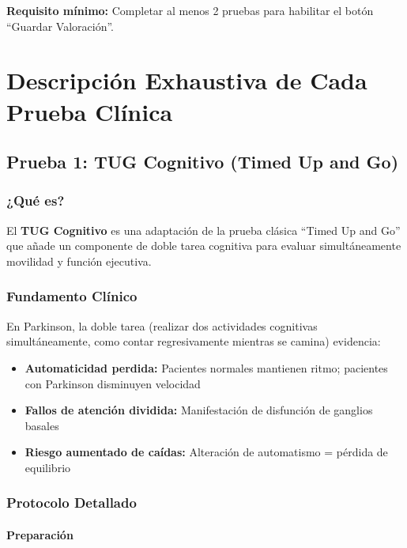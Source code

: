 \documentclass[12pt,a4paper,spanish,oneside]{book}
\begin{document}
\textbf{Requisito mínimo:} Completar al menos 2 pruebas para habilitar el botón ``Guardar Valoración''.

\chapter{Descripción Exhaustiva de Cada Prueba Clínica}

\section{Prueba 1: TUG Cognitivo (Timed Up and Go)}

\subsection{¿Qué es?}

El \textbf{TUG Cognitivo} es una adaptación de la prueba clásica ``Timed Up and Go'' que añade un componente de doble tarea cognitiva para evaluar simultáneamente movilidad y función ejecutiva.

\subsection{Fundamento Clínico}

En Parkinson, la doble tarea (realizar dos actividades cognitivas simultáneamente, como contar regresivamente mientras se camina) evidencia:

\begin{itemize}
  \item \textbf{Automaticidad perdida:} Pacientes normales mantienen ritmo; pacientes con Parkinson disminuyen velocidad
  \item \textbf{Fallos de atención dividida:} Manifestación de disfunción de ganglios basales
  \item \textbf{Riesgo aumentado de caídas:} Alteración de automatismo = pérdida de equilibrio
\end{itemize}

\subsection{Protocolo Detallado}

\subsubsection{Preparación}
\end{document}
